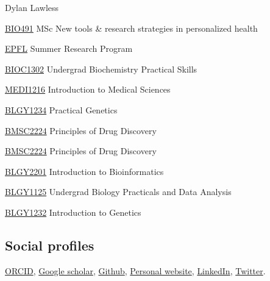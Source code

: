 \documentclass[12pt,a4paper]{article}
\begin{document}
\begin{cv}{Dylan Lawless}
\begin{cvlist}{}
\item[\href{https://edu.epfl.ch/coursebook/en/new-tools-research-strategies-in-personalized-health-BIO-491?cb_cycle=bama_cyclemaster&cb_section=sv}{BIO491}] MSc New tools \& research strategies in personalized health

\item[\href{https://www.epfl.ch/schools/sv/education/summer-research-program/}{EPFL}] Summer Research Program

\item[\href{http://webprod3.leeds.ac.uk/catalogue/dynmodules.asp?Y=201718&M=BIOL-1302}{BIOC1302}] Undergrad Biochemistry Practical Skills

\item[\href{http://webprod3.leeds.ac.uk/catalogue/dynmodules.asp?Y=201718&M=MEDI-1216}{MEDI1216}] Introduction to Medical Sciences 

\item[\href{http://webprod3.leeds.ac.uk/catalogue/dynmodules.asp?Y=201718&M=BLGY-1234}{BLGY1234}] Practical Genetics

\item[\href{http://webprod3.leeds.ac.uk/catalogue/dynmodules.asp?Y=201718&M=BMSC-2224}{BMSC2224}] Principles of Drug Discovery

\item[\href{http://webprod3.leeds.ac.uk/catalogue/dynmodules.asp?Y=201718&M=BMSC-2224}{BMSC2224}] Principles of Drug Discovery

\item[\href{http://webprod3.leeds.ac.uk/catalogue/dynmodules.asp?Y=201718&M=BLGY-2201}{BLGY2201}] Introduction to Bioinformatics

\item[\href{http://webprod3.leeds.ac.uk/catalogue/dynmodules.asp?Y=201718&M=BLGY-1125}{BLGY1125}] Undergrad Biology Practicals and Data Analysis

\item[\href{http://webprod3.leeds.ac.uk/catalogue/dynmodules.asp?Y=201718&M=BLGY-1232}{BLGY1232}] Introduction to Genetics
\end{cvlist}

\subsection*{Social profiles}
\href{https://orcid.org/0000-0001-8496-3725}{ORCID},
\href{https://scholar.google.com/citations?user=RPBxP1wAAAAJ&hl=en&oi=ao}{Google scholar},
\href{https://github.com/DylanLawless}{Github},
\href{https://lawlessgenomics.com}{Personal website},
\href{https://www.linkedin.com/in/dylan-lawless-human-genomics/}{LinkedIn}, 
\href{https://twitter.com/meddlaw}{Twitter}.


\end{cv}
\end{document}
